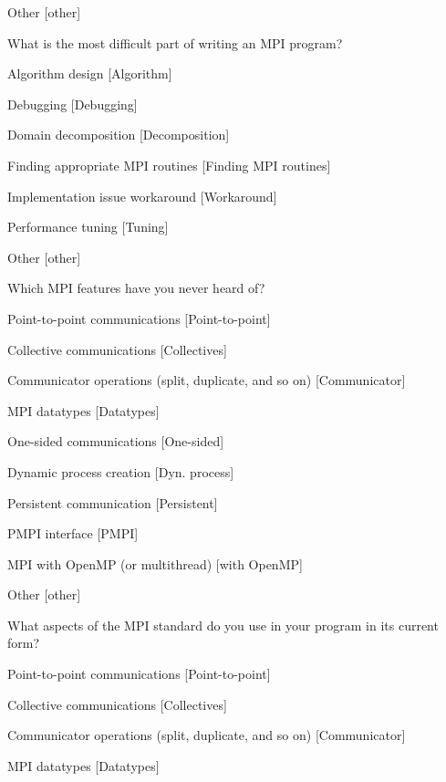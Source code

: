 \documentclass[conference,10pt,letterpaper]{IEEEtran}
\begin{document}
{{\begin{description}
\begin{inparaenum}[{\bf C}1)]
    \item Other [other]
    \end{inparaenum}
  \item[Q15:] What is the most difficult part of writing an MPI program?
    \begin{inparaenum}[{\bf C}1)]
    \item Algorithm design [Algorithm]
    \item Debugging [Debugging]
    \item Domain decomposition [Decomposition]
    \item Finding appropriate MPI routines [Finding MPI routines]
    \item Implementation issue workaround [Workaround]
    \item Performance tuning [Tuning]
    \item Other [other]
    \end{inparaenum}
  \item[Q16*:] Which MPI features have you never heard of?
    \begin{inparaenum}[{\bf C}1)]
    \item Point-to-point communications [Point-to-point]
    \item Collective communications [Collectives]
    \item Communicator operations (split, duplicate, and so on) [Communicator]
    \item MPI datatypes [Datatypes]
    \item One-sided communications [One-sided]
    \item Dynamic process creation [Dyn. process]
    \item Persistent communication [Persistent]
    \item PMPI interface [PMPI]
    \item MPI with OpenMP (or multithread) [with OpenMP]
    \item Other [other]
    \end{inparaenum}
  \item[Q17*:] What aspects of the MPI standard do you use in your program in its current form?
    \begin{inparaenum}[{\bf C}1)]
    \item Point-to-point communications [Point-to-point]
    \item Collective communications [Collectives]
    \item Communicator operations (split, duplicate, and so on) [Communicator]
    \item MPI datatypes [Datatypes]

\end{inparaenum}
\end{description}}}
\end{document}
